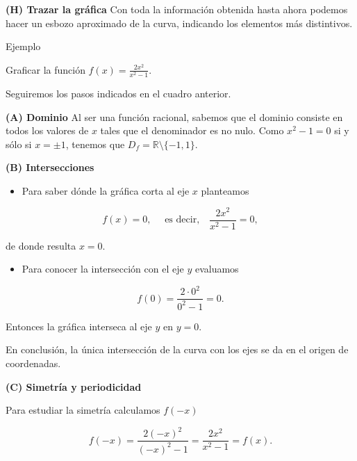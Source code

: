 \documentclass[
  letterpaper,
]{book}
\providecommand{\tightlist}{%
  \setlength{\itemsep}{0pt}\setlength{\parskip}{0pt}}
\theoremstyle{plain}
\theoremstyle{remark}
\begin{document}
\textbf{(H) Trazar la gráfica} Con toda la información obtenida hasta
ahora podemos hacer un esbozo aproximado de la curva, indicando los
elementos más distintivos.

Ejemplo

Graficar la función \(\displaystyle f(x)=\frac{2x^2}{x^2-1}\).

\begin{tcolorbox}[enhanced jigsaw, opacityback=0, left=2mm, opacitybacktitle=0.6, toprule=.15mm, bottomrule=.15mm, colbacktitle=quarto-callout-tip-color!10!white, titlerule=0mm, bottomtitle=1mm, title=\textcolor{quarto-callout-tip-color}{\faLightbulb}\hspace{0.5em}{Solución}, toptitle=1mm, colframe=quarto-callout-tip-color-frame, colback=white, breakable, rightrule=.15mm, arc=.35mm, leftrule=.75mm, coltitle=black]

Seguiremos los pasos indicados en el cuadro anterior.

\textbf{(A) Dominio} Al ser una función racional, sabemos que el dominio
consiste en todos los valores de \(x\) tales que el denominador es no
nulo. Como \(x^2-1=0\) si y sólo si \(x=\pm 1\), tenemos que
\(D_f =\mathbb{R}\setminus \{-1,1\}\).

\textbf{(B) Intersecciones}

\begin{itemize}
\tightlist
\item
  Para saber dónde la gráfica corta al eje \(x\) planteamos
\end{itemize}

\[
f(x)=0, \quad \text{ es decir,} \quad \frac{2x^2}{x^2-1}=0,
\]

de donde resulta \(x=0\).

\begin{itemize}
\tightlist
\item
  Para conocer la intersección con el eje \(y\) evaluamos
\end{itemize}

\[
f(0)=\frac{2\cdot 0^2}{0^2-1}=0.
\]

Entonces la gráfica interseca al eje \(y\) en \(y=0\).

En conclusión, la única intersección de la curva con los ejes se da en
el origen de coordenadas.

\textbf{(C) Simetría y periodicidad}

Para estudiar la simetría calculamos \(f(-x)\)

\[
f(-x)=\frac{2(-x)^2}{(-x)^2-1}=\frac{2x^2}{x^2-1}=f(x).
\]


\end{tcolorbox}
\end{document}
